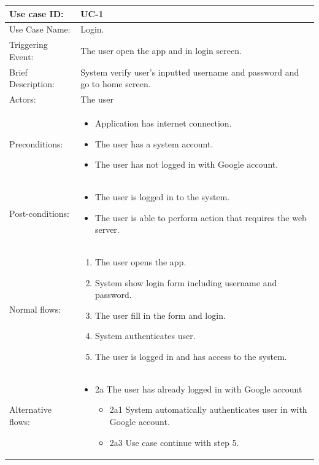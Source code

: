 \begin{table}[]
\begin{tabular}{| m{4cm} | m{11cm} |}
\hline
Use case ID:       & UC-1 \\ \hline
Use Case Name:     & Login. \\ \hline
Triggering Event:  & The user open the app and in login screen. \\ \hline
Brief Description: & System verify user's inputted username and password and go to home screen. \\ \hline
Actors:            & The user \\ \hline
Preconditions:     & \begin{itemize}
    \item Application has internet connection.
    \item The user has a system account.
    \item The user has not logged in with Google account.
\end{itemize} \\ \hline
Post-conditions:   & \begin{itemize}
    \item The user is logged in to the system.
    \item The user is able to perform action that requires the web server.
\end{itemize} \\ \hline
Normal flows:      & \begin{enumerate}
    \item The user opens the app.
    \item System show login form including username and password.
    \item The user fill in the form and login.
    \item System authenticates user.
    \item The user is logged in and has access to the system.
\end{enumerate} \\ \hline
Alternative flows: & \begin{itemize}
    \item {2a The user has already logged in with Google account}
    \begin{itemize}
        \item 2a1 System automatically authenticates user in with Google account.
        \item 2a3 Use case continue with step 5.
    \end{itemize}

\end{itemize}
\end{tabular}
\end{table}
